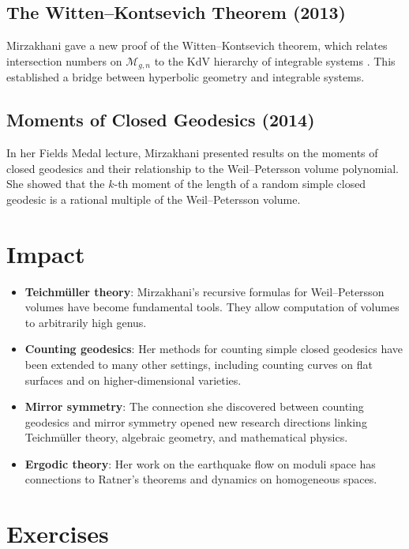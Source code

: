 \subsection{The Witten--Kontsevich Theorem (2013)}

Mirzakhani gave a new proof of the Witten--Kontsevich theorem, which relates intersection numbers on $\mathcal{M}_{g,n}$ to the KdV hierarchy of integrable systems \cite{mirzakhani2013}. This established a bridge between hyperbolic geometry and integrable systems.

\subsection{Moments of Closed Geodesics (2014)}

In her Fields Medal lecture, Mirzakhani presented results on the moments of closed geodesics and their relationship to the Weil--Petersson volume polynomial. She showed that the $k$-th moment of the length of a random simple closed geodesic is a rational multiple of the Weil--Petersson volume.

\section{Impact}

\begin{itemize}
\item \textbf{Teichm\"uller theory}: Mirzakhani's recursive formulas for Weil--Petersson volumes have become fundamental tools. They allow computation of volumes to arbitrarily high genus.
\item \textbf{Counting geodesics}: Her methods for counting simple closed geodesics have been extended to many other settings, including counting curves on flat surfaces and on higher-dimensional varieties.
\item \textbf{Mirror symmetry}: The connection she discovered between counting geodesics and mirror symmetry opened new research directions linking Teichm\"uller theory, algebraic geometry, and mathematical physics.
\item \textbf{Ergodic theory}: Her work on the earthquake flow on moduli space has connections to Ratner's theorems and dynamics on homogeneous spaces.
\end{itemize}

\section{Exercises}

